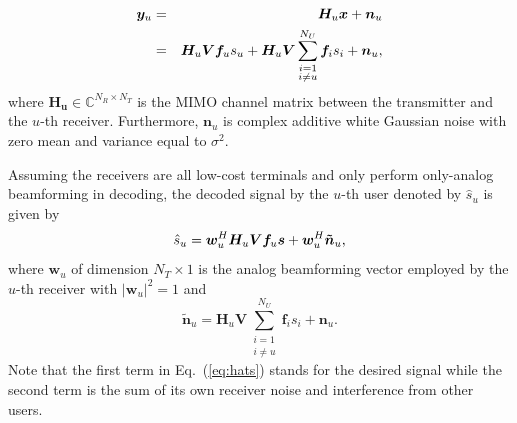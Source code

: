 \documentclass[conference]{IEEEtran}
\begin{document}
\begin{eqnarray}{\label{eq:transx2}}
{\bm y}_u &=& \bm{H}_u \bm{x} + \bm{n}_u\\
&=&\bm{H}_u \bm{V}\bm{f}_us_u+\bm{H}_u \bm{V}\sum_{\substack{i=1 \\ i\neq u}}^{N_U}\bm{f}_is_i+\bm{n}_u,
\end{eqnarray}
where $\bm{H_u}$$\in\mathbb{C}^{N_R\times N_T}$ is the MIMO channel matrix between the transmitter and the $u$-th receiver\cite{el2014spatially}. Furthermore, $\bm{n}_u$ is complex additive white Gaussian noise with zero mean and variance equal to $\sigma^2$.

Assuming the receivers are all low-cost terminals and only perform only-analog beamforming in decoding, the decoded signal by the $u$-th user denoted by $\hat{s}_u$ is given by
\begin{equation}{\label{eq:hats}}
\hat{s}_u = \bm{w}_u^H \bm{H}_u \bm{V} \bm{f}_{u} \bm{s} + \bm{w}_u^H \bm{\tilde{n}}_u,
\end{equation}
where ${\bm w}_u$ of dimension $N_T\times 1$ is the analog beamforming vector employed by the $u$-th receiver with $|\bm{w}_u|^2=1$ and
\begin{equation}
\bm{\tilde{n}}_u=\bm{H}_u \bm{V}\sum_{\substack{i=1 \\ i\neq u}}^{N_U}\bm{f}_is_i+\bm{n}_u.
\end{equation}
Note that the first term in Eq.~(\ref{eq:hats}) stands for the desired signal while the second term is the sum of its own receiver noise and interference from other users.
\end{document}
